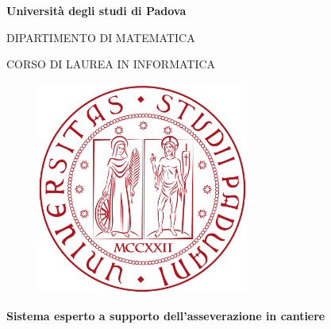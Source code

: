 \begin{titlepage}

\begin{center}

\begin{LARGE}
\textbf{Università degli studi di Padova}\\
\end{LARGE}

\vspace{10pt}

\begin{Large}
\textsc{DIPARTIMENTO DI MATEMATICA}\\
\end{Large}

\vspace{10pt}

\begin{large}
\textsc{CORSO DI LAUREA IN INFORMATICA}\\
\end{large}

\vspace{30pt}
\begin{figure}[htbp]
\begin{center}
\includegraphics[height=7cm]{Pics/logo-unipd.png}
\end{center}
\end{figure}
\vspace{30pt} 

\begin{LARGE}
\begin{center}
\textbf{Sistema esperto a supporto dell'asseverazione in cantiere}\\
\end{center}
\end{LARGE}

\vspace{10pt} 


\end{center}
\end{titlepage}
